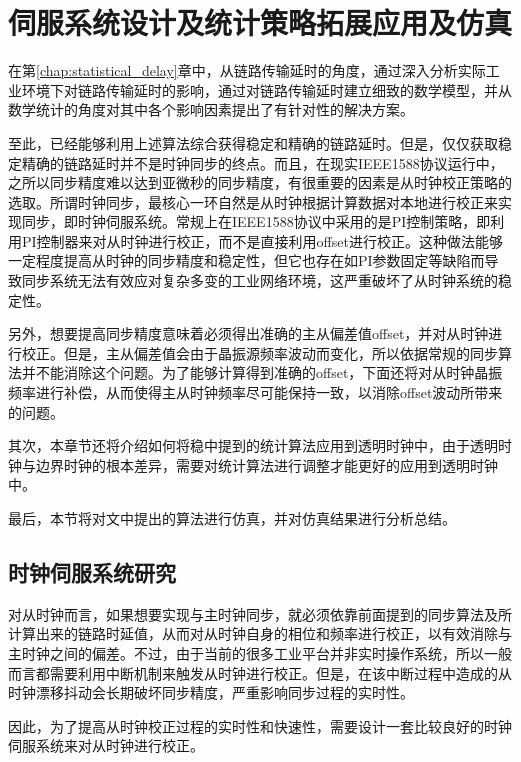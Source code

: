 
\chapter{伺服系统设计及统计策略拓展应用及仿真}
在第\ref{chap:statistical_delay}章中，从链路传输延时的角度，通过深入分析实际工业环境下对链路传输延时的影响，通过对链路传输延时建立细致的数学模型，并从数学统计的角度对其中各个影响因素提出了有针对性的解决方案。

至此，已经能够利用上述算法综合获得稳定和精确的链路延时。但是，仅仅获取稳定精确的链路延时并不是时钟同步的终点。而且，在现实IEEE1588协议运行中，之所以同步精度难以达到亚微秒的同步精度，有很重要的因素是从时钟校正策略的选取。所谓时钟同步，最核心一环自然是从时钟根据计算数据对本地进行校正来实现同步，即时钟伺服系统。常规上在IEEE1588协议中采用的是PI控制策略，即利用PI控制器来对从时钟进行校正，而不是直接利用offset进行校正。这种做法能够一定程度提高从时钟的同步精度和稳定性，但它也存在如PI参数固定等缺陷而导致同步系统无法有效应对复杂多变的工业网络环境，这严重破坏了从时钟系统的稳定性。

另外，想要提高同步精度意味着必须得出准确的主从偏差值offset，并对从时钟进行校正。但是，主从偏差值会由于晶振源频率波动而变化，所以依据常规的同步算法并不能消除这个问题。为了能够计算得到准确的offset，下面还将对从时钟晶振频率进行补偿，从而使得主从时钟频率尽可能保持一致，以消除offset波动所带来的问题。

其次，本章节还将介绍如何将稳中提到的统计算法应用到透明时钟中，由于透明时钟与边界时钟的根本差异，需要对统计算法进行调整才能更好的应用到透明时钟中。

最后，本节将对文中提出的算法进行仿真，并对仿真结果进行分析总结。

\section{时钟伺服系统研究}
对从时钟而言，如果想要实现与主时钟同步，就必须依靠前面提到的同步算法及所计算出来的链路时延值，从而对从时钟自身的相位和频率进行校正，以有效消除与主时钟之间的偏差。不过，由于当前的很多工业平台并非实时操作系统，所以一般而言都需要利用中断机制来触发从时钟进行校正。但是，在该中断过程中造成的从时钟漂移抖动会长期破坏同步精度，严重影响同步过程的实时性。

因此，为了提高从时钟校正过程的实时性和快速性，需要设计一套比较良好的时钟伺服系统来对从时钟进行校正。

